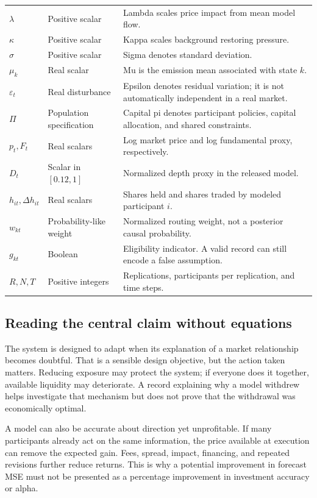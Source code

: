 \begin{longtable}{p{.14\linewidth}p{.2\linewidth}p{.58\linewidth}}
$\lambda$ & Positive scalar & Lambda scales price impact from mean model flow.\\
$\kappa$ & Positive scalar & Kappa scales background restoring pressure.\\
$\sigma$ & Positive scalar & Sigma denotes standard deviation.\\
$\mu_k$ & Real scalar & Mu is the emission mean associated with state $k$.\\
$\varepsilon_t$ & Real disturbance & Epsilon denotes residual variation; it is not automatically independent in a real market.\\
$\Pi$ & Population specification & Capital pi denotes participant policies, capital allocation, and shared constraints.\\
$p_t,F_t$ & Real scalars & Log market price and log fundamental proxy, respectively.\\
$D_t$ & Scalar in $[0.12,1]$ & Normalized depth proxy in the released model.\\
$h_{it},\Delta h_{it}$ & Real scalars & Shares held and shares traded by modeled participant $i$.\\
$w_{kt}$ & Probability-like weight & Normalized routing weight, not a posterior causal probability.\\
$g_{kt}$ & Boolean & Eligibility indicator. A valid record can still encode a false assumption.\\
$R,N,T$ & Positive integers & Replications, participants per replication, and time steps.\\
\end{longtable}

\subsection{Reading the central claim without equations}
The system is designed to adapt when its explanation of a market relationship becomes doubtful. That is a sensible design objective, but the action taken matters. Reducing exposure may protect the system; if everyone does it together, available liquidity may deteriorate. A record explaining why a model withdrew helps investigate that mechanism but does not prove that the withdrawal was economically optimal.

A model can also be accurate about direction yet unprofitable. If many participants already act on the same information, the price available at execution can remove the expected gain. Fees, spread, impact, financing, and repeated revisions further reduce returns. This is why a potential improvement in forecast MSE must not be presented as a percentage improvement in investment accuracy or alpha.

